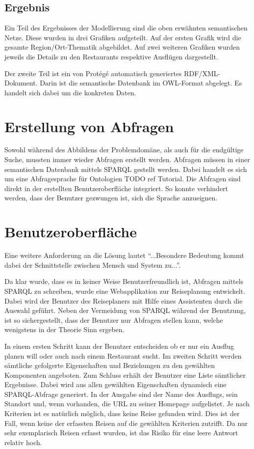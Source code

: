 \subsection{Ergebnis}
\label{subsec:loesung_modellierung_ergebnis}
Ein Teil des Ergebnisses der Modellierung sind die oben erwähnten semantischen Netze. Diese wurden in drei Grafiken aufgeteilt. Auf der ersten Grafik wird die gesamte Region/Ort-Thematik abgebildet. Auf zwei weiteren Grafiken wurden jeweils die Details zu den Restaurants respektive Ausflügen dargestellt.

Der zweite Teil ist ein von Protégé automatisch generiertes RDF/XML-Dokument. Darin ist die semantische Datenbank im OWL-Format abgelegt. Es handelt sich dabei um die konkreten Daten.

\section{Erstellung von Abfragen}
\label{sec:loesung_sparql}
Sowohl während des Abbildens der Problemdomäne, als auch für die endgültige Suche, mussten immer wieder Abfragen erstellt werden. Abfragen müssen in einer semantischen Datenbank mittels SPARQL gestellt werden. Dabei handelt es sich um eine Abfragesprache für Ontologien {\color{red} TODO ref Tutorial}. Die Abfragen sind direkt in der erstellten Benutzeroberfläche integriert. So konnte verhindert werden, dass der Benutzer gezwungen ist, sich die Sprache anzueignen.

\section{Benutzeroberfläche}
\label{sec:loesung_gui}
Eine weitere Anforderung an die Lösung lautet ``...Besondere Bedeutung kommt dabei der Schnittstelle zwischen Mensch und System zu...''.~\cite{Aufgabenstellung}

Da klar wurde, dass es in keiner Weise Benutzerfreundlich ist, Abfragen mittels SPARQL zu schreiben, wurde eine Webapplikation zur Reiseplanung entwickelt. Dabei wird der Benutzer des Reiseplaners mit Hilfe eines Assistenten durch die Auswahl geführt. Neben der Vermeidung von SPARQL während der Benutzung, ist so sichergestellt, dass der Benutzer nur Abfragen stellen kann, welche wenigstens in der Theorie Sinn ergeben.

In einem ersten Schritt kann der Benutzer entscheiden ob er nur ein Ausflug planen will oder auch nach einem Restaurant sucht. Im zweiten Schritt werden sämtliche gefolgerte Eigenschaften und Beziehungen zu den gewählten Komponenten angeboten. Zum Schluss erhält der Benutzer eine Liste sämtlicher Ergebnisse. Dabei wird aus allen gewählten Eigenschaften dynamisch eine SPARQL-Abfrage generiert. In der Ausgabe sind der Name des Ausflugs, sein Standort und, wenn vorhanden, die URL zu seiner Homepage aufgelistet. Je nach Kriterien ist es natürlich möglich, dass keine Reise gefunden wird. Dies ist der Fall, wenn keine der erfassten Reisen auf die gewählten Kriterien zutrifft. Da nur sehr exemplarisch Reisen erfasst wurden, ist das Risiko für eine leere Antwort relativ hoch.
